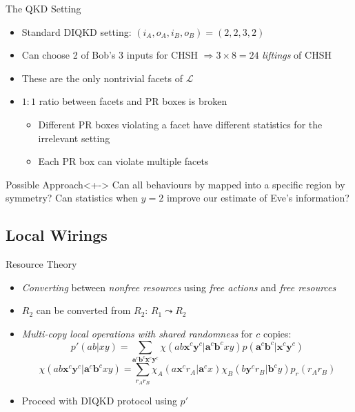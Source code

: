 \documentclass[xcolor=dvipsnames]{beamer}
\newcommand{\?}{\mathrel{?}} %
\newcommand{\cvec}[1]{\boldsymbol{\mathbf{#1}}}    %
\newcommand{\Ls}{\mathcal{L}}
\begin{document}
\begin{frame}{The QKD Setting}
  \begin{itemize}[<+->]
    \item Standard DIQKD setting: \((i_A, o_A, i_B, o_B) = (2,2,3,2)\)
    \item Can choose 2 of Bob's 3 inputs for CHSH \(\Rightarrow 3 \times 8 = 24\) \emph{liftings} of CHSH
    \item These are the only nontrivial facets of \(\Ls\)
    \item \(1 : 1\) ratio between facets and PR boxes is broken
      \begin{itemize}
        \item Different PR boxes violating a facet have different statistics for the irrelevant setting
        \item Each PR box can violate multiple facets
      \end{itemize}
  \end{itemize}
  \begin{block}{Possible Approach}<+->
    Can all behaviours by mapped into a specific region by symmetry? Can statistics when \(y=2\) improve our estimate of Eve's information?
  \end{block}
\end{frame}


\subsection{Local Wirings}

\begin{frame}{Resource Theory}
  \begin{itemize}[<+->]
    \item \emph{Converting} between \emph{nonfree resources} using \emph{free actions} and \emph{free resources}
    \item \(R_2\) can be converted from \(R_2\): \(R_1 \leadsto R_2\)
    \item \emph{Multi-copy local operations with shared randomness} for \(c\) copies:
      \[ p'(ab|xy) = \sum_{\cvec{a}^c\cvec{b}^c\cvec{x}^c\cvec{y}^c} \chi(ab\cvec{x}^c\cvec{y}^c|\cvec{a}^c\cvec{b}^cxy) p(\cvec{a}^c\cvec{b}^c|\cvec{x}^c\cvec{y}^c) \]
      \[ \chi(ab\cvec{x}^c\cvec{y}^c|\cvec{a}^c\cvec{b}^cxy) = \sum_{r_A r_B} \chi_A(a\cvec{x}^c r_A|\cvec{a}^cx) \chi_B(b\cvec{y}^c r_B|\cvec{b}^cy) p_r(r_A r_B) \]
    \item Proceed with DIQKD protocol using \(p'\)
  \end{itemize}
\end{frame}
\end{document}
